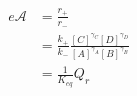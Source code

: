 \begin{eqnarray}\label{eqn:reaction-affinity-ratio}
e\mathcal{A} &= \frac{r_+}{r_-} \\
& = \frac{k_+}{k_-}\frac{[C]^{\gamma_C}[D]^{\gamma_D}}{[A]^{\gamma_A}[B]^{\gamma_B}} \\
& = \frac{1}{K_{eq}}{Q_r} \\
\end{eqnarray}
